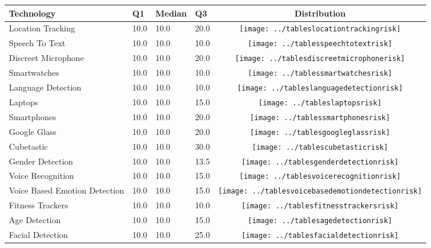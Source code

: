 \begin{table}[t]
\begin{center}
\small
\begin{tabular}{| p{2cm} | p{1cm} | p{1cm} | p{1cm} | c |}
\hline
Technology & Q1 &  Median & Q3 & Distribution  \\ 
\hline
Location Tracking & 10.0 & 10.0 & 20.0 & \texttt{[image: ../tableslocationtrackingrisk]} \\ 
Speech To Text & 10.0 & 10.0 & 10.0 & \texttt{[image: ../tablesspeechtotextrisk]} \\ 
Discreet Microphone & 10.0 & 10.0 & 20.0 & \texttt{[image: ../tablesdiscreetmicrophonerisk]} \\ 
Smartwatches & 10.0 & 10.0 & 10.0 & \texttt{[image: ../tablessmartwatchesrisk]} \\ 
Language Detection & 10.0 & 10.0 & 10.0 & \texttt{[image: ../tableslanguagedetectionrisk]} \\ 
Laptops & 10.0 & 10.0 & 15.0 & \texttt{[image: ../tableslaptopsrisk]} \\ 
Smartphones & 10.0 & 10.0 & 20.0 & \texttt{[image: ../tablessmartphonesrisk]} \\ 
Google Glass & 10.0 & 10.0 & 20.0 & \texttt{[image: ../tablesgoogleglassrisk]} \\ 
Cubetastic & 10.0 & 10.0 & 30.0 & \texttt{[image: ../tablescubetasticrisk]} \\ 
Gender Detection & 10.0 & 10.0 & 13.5 & \texttt{[image: ../tablesgenderdetectionrisk]} \\ 
Voice Recognition & 10.0 & 10.0 & 15.0 & \texttt{[image: ../tablesvoicerecognitionrisk]} \\ 
Voice Based Emotion Detection & 10.0 & 10.0 & 15.0 & \texttt{[image: ../tablesvoicebasedemotiondetectionrisk]} \\ 
Fitness Trackers & 10.0 & 10.0 & 10.0 & \texttt{[image: ../tablesfitnesstrackersrisk]} \\ 
Age Detection & 10.0 & 10.0 & 15.0 & \texttt{[image: ../tablesagedetectionrisk]} \\ 
Facial Detection & 10.0 & 10.0 & 25.0 & \texttt{[image: ../tablesfacialdetectionrisk]} \\ 

\end{tabular}
\end{center}
\end{table}
